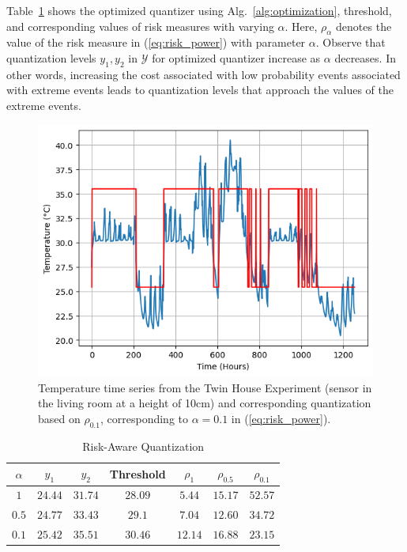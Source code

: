 \documentclass[journal]{IEEEtran}
\begin{document}
Table~\ref{table:Twin_house} shows the optimized quantizer using Alg.~\ref{alg:optimization}, threshold, and corresponding values of risk measures with varying $\alpha$. Here, $\rho_{\alpha}$ denotes the value of the risk measure in (\ref{eq:risk_power}) with parameter $\alpha$. Observe that quantization levels $y_1,y_2$ in $\mathcal{Y}$ for optimized quantizer increase as $\alpha$ decreases. In other words, increasing the cost associated with low probability events associated with extreme events leads to quantization levels that approach the values of the extreme events.  

\begin{figure}
	\centering
	\includegraphics[width=\linewidth]{time_series_FIN.png}%
	\caption{Temperature time series from the Twin House Experiment \cite{Kersken2020} (sensor in the living room at a height of 10cm) and corresponding quantization based on $\rho_{0.1}$, corresponding to $\alpha = 0.1$ in (\ref{eq:risk_power}).}
	\label{fig:time_series}
\end{figure}

\begin{table}[h]
	\centering
	\caption{Risk-Aware Quantization}
	\begin{tabular}{|c|c|c|c|c|c|c|}
		\hline
		$\alpha$ & $y_1$ & $y_2$ & Threshold &  $\rho_1$ & $\rho_{0.5}$ &  $\rho_{0.1}$ \\
		\hline
		$1$ & $24.44$ & $31.74$ & $28.09$ & $\mathbf{5.44}$ & $15.17$ & $52.57$ \\
		\hline
		$0.5$ & $24.77$ & $33.43$ & $29.1$ & $7.04$ & $\mathbf{12.60}$ & $34.72$ \\
		\hline
		$0.1$ & $25.42$ & $35.51$ & $30.46$ & $12.14$ & $16.88$ & $\mathbf{23.15}$ \\
		\hline
	\end{tabular}
\label{table:Twin_house}
\end{table}
\end{document}
